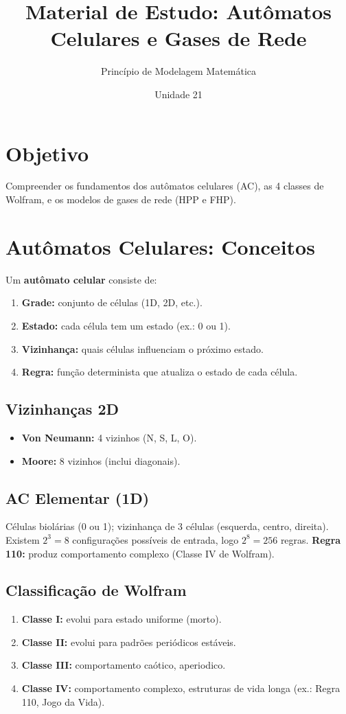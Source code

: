 \documentclass[12pt,a4paper]{article}
\title{Material de Estudo: Aut\^omatos Celulares e Gases de Rede}
\author{Princ\'ipio de Modelagem Matem\'atica}
\date{Unidade 21}
\begin{document}
\maketitle

\section*{Objetivo}
Compreender os fundamentos dos aut\^omatos celulares (AC), as 4 classes de Wolfram, e os modelos de gases de rede (HPP e FHP).

\section*{Aut\^omatos Celulares: Conceitos}

Um \textbf{aut\^omato celular} consiste de:
\begin{enumerate}
  \item \textbf{Grade:} conjunto de c\'elulas (1D, 2D, etc.).
  \item \textbf{Estado:} cada c\'elula tem um estado (ex.: 0 ou 1).
  \item \textbf{Vizinhan\c{c}a:} quais c\'elulas influenciam o pr\'oximo estado.
  \item \textbf{Regra:} fun\c{c}\~ao determinista que atualiza o estado de cada c\'elula.
\end{enumerate}

\subsection*{Vizinhan\c{c}as 2D}
\begin{itemize}
  \item \textbf{Von Neumann:} 4 vizinhos (N, S, L, O).
  \item \textbf{Moore:} 8 vizinhos (inclui diagonais).
\end{itemize}

\subsection*{AC Elementar (1D)}
C\'elulas biol\'arias (0 ou 1); vizinhan\c{c}a de 3 c\'elulas (esquerda, centro, direita).
Existem $2^3 = 8$ configura\c{c}\~oes poss\'iveis de entrada, logo $2^8 = 256$ regras.
\textbf{Regra 110:} produz comportamento complexo (Classe IV de Wolfram).

\subsection*{Classifica\c{c}\~ao de Wolfram}
\begin{enumerate}
  \item \textbf{Classe I:} evolui para estado uniforme (morto).
  \item \textbf{Classe II:} evolui para padr\~oes peri\'odicos est\'aveis.
  \item \textbf{Classe III:} comportamento ca\'otico, aperiodico.
  \item \textbf{Classe IV:} comportamento complexo, estruturas de vida longa (ex.: Regra 110, Jogo da Vida).
\end{enumerate}
\end{document}
